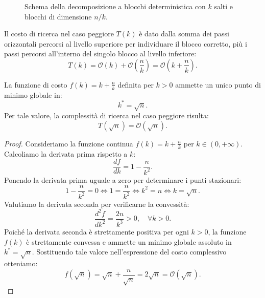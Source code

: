 \begin{figure}[H]
{%
}
\caption{Schema della decomposizione a blocchi deterministica con $k$ salti e blocchi di dimensione $n/k$.}
\label{fig:square-root-decomposition-schema}
\end{figure}

Il costo di ricerca nel caso peggiore $T(k)$ è dato dalla somma dei passi orizzontali percorsi al livello superiore per individuare il blocco corretto, più i passi percorsi all'interno del singolo blocco al livello inferiore:
\begin{equation}
  T(k) = \mathcal{O}(k) + \mathcal{O}\left(\frac{n}{k}\right) = \mathcal{O}\left(k + \frac{n}{k}\right).
\end{equation}

\begin{theorem}
La funzione di costo $f(k) = k + \frac{n}{k}$ definita per $k > 0$ ammette un unico punto di minimo globale in:
\begin{equation}
  k^* = \sqrt{n}.
\end{equation}
Per tale valore, la complessità di ricerca nel caso peggiore risulta:
\begin{equation}
  T(\sqrt{n}) = \mathcal{O}(\sqrt{n}).
\end{equation}
\end{theorem}

\begin{proof}
Consideriamo la funzione continua $f(k) = k + \frac{n}{k}$ per $k \in (0, +\infty)$. Calcoliamo la derivata prima rispetto a $k$:
\begin{equation}
  \frac{df}{dk} = 1 - \frac{n}{k^2}.
\end{equation}
Ponendo la derivata prima uguale a zero per determinare i punti stazionari:
\begin{equation}
  1 - \frac{n}{k^2} = 0 \iff 1 = \frac{n}{k^2} \iff k^2 = n \iff k = \sqrt{n}.
\end{equation}
Valutiamo la derivata seconda per verificarne la convessità:
\begin{equation}
  \frac{d^2f}{dk^2} = \frac{2n}{k^3} > 0, \quad \forall k > 0.
\end{equation}
Poiché la derivata seconda è strettamente positiva per ogni $k > 0$, la funzione $f(k)$ è strettamente convessa e ammette un minimo globale assoluto in $k^* = \sqrt{n}$. Sostituendo tale valore nell'espressione del costo complessivo otteniamo:
\begin{equation}
  f(\sqrt{n}) = \sqrt{n} + \frac{n}{\sqrt{n}} = 2\sqrt{n} = \mathcal{O}(\sqrt{n}).
\end{equation}
\end{proof}


